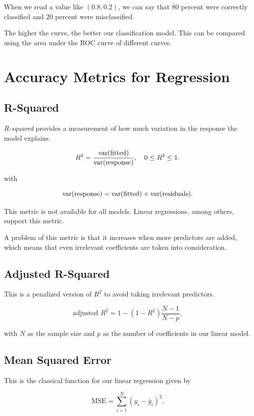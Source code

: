When we read a value like \((0.8, 0.2)\), we can say that 80 percent were correctly classified and 20 percent were misclassified.

The higher the curve, the better our classification model. This can be compared using the area under the ROC curve of different 
curves.

\section{Accuracy Metrics for Regression}

\subsection{R-Squared}

\emph{R-squared} provides a measurement of how much variation in the response the model explains.

\[
	R^2 = \frac{\mathrm{var}(\text{fitted})}{\mathrm{var}(\text{response})}, \quad 0 \le R^2 \le 1.
\]

with

\[
	\mathrm{var}(\text{response}) = \mathrm{var}(\text{fitted}) + \mathrm{var}(\text{residuals}).
\]

This metric is not available for all models. Linear regressions, among others, support this metric.

A problem of this metric is that it increases when more predictors are added, which means that even irrelevant coefficients are
taken into consideration.

\subsection{Adjusted R-Squared}

This is a penalized version of \(R^2\) to avoid taking irrelevant predictors.

\[
	\text{adjusted }R^2 = 1 - (1 - R^2) \frac{N - 1}{N - p},
\]

with \(N\) as the sample size and \(p\) as the number of coefficients in our linear model.

\subsection{Mean Squared Error}

This is the classical function for our linear regression given by

\[
	\mathrm{MSE} = \sum_{i = 1}^{N} (y_i - \tilde{y_i})^2.
\]

